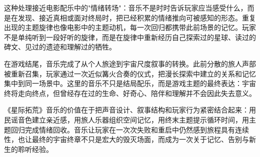 这种处理接近电影配乐中的"情绪转场"：音乐不是时时告诉玩家应当感受什么，而是在发现、接近真相或面对终局时，把已经积累的情绪推向可被感知的形态。重复出现的主题旋律也像电影中的主题动机，每一次回归都携带此前场景的记忆。玩家不是单纯听到一段好听的旋律，而是在旋律中重新经历自己探索过的星球、读过的碑文、见过的遗迹和理解过的牺牲。

在游戏结尾，音乐完成了从个人旅途到宇宙尺度叙事的转换。此前分散的旅人声部被重新召集，玩家通过一次近似篝火合奏的仪式，把漫长探索中建立的关系和记忆集中到同一场景中。这里的音乐不只是结局配乐，而是游戏主题的最终表达：宇宙终将走向终点，但曾经存在过的生命、好奇心、陪伴和理解并不会因此失去意义。

《星际拓荒》音乐的价值在于把声音设计、叙事结构和玩家行为紧密结合起来：用民谣音色建立亲近感，用旅人乐器组织空间记忆，用终末主题提示循环时间，用主题回归完成情绪回收。音乐让玩家在一次次失败和重启中仍然感到旅程具有连续性，也让最终的宇宙终章不只是宏大的毁灭场面，而成为一次关于记忆、告别与新生的聆听经验。
